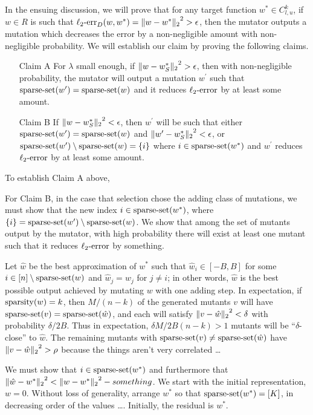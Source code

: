 In the ensuing discussion, we will prove that for any target function
$w^* \in C^k_{l,u}$, if $w \in R$ is such that
$\mathrm{\ell_2\mbox{-}err}_D(w, w^*) = {\Vert w - w^* \Vert_{2}}^2 > \epsilon$,
then the mutator outputs a mutation which decreases the error by a
non-negligible amount with non-negligible probability.
We will establish our claim by proving the following claims.

\begin{enumerate}
\item[Claim A] For $\lambda$ small enough, if ${\Vert w - w^*_S \Vert_{2}}^2 > \epsilon$,
then with non-negligible probability, the mutator will output a mutation $w^\prime$ such
that $\mathrm{sparse\mbox{-}set}(w^\prime) = \mathrm{sparse\mbox{-}set}(w)$ and it reduces $\mathrm{\ell_2\mbox{-}error}$ by at least some amount.
\item[Claim B] If ${\Vert w - w^*_S \Vert_{2}}^2 < \epsilon$, then $w^\prime$ will be
such that either $\mathrm{sparse\mbox{-}set}(w^\prime) = \mathrm{sparse\mbox{-}set}(w)$ and
${\Vert w^\prime - w^*_S \Vert_{2}}^2 < \epsilon$, or
$\mathrm{sparse\mbox{-}set}(w^\prime) \setminus \mathrm{sparse\mbox{-}set}(w) = \{i\}$ where $i \in \mathrm{sparse\mbox{-}set}(w^*)$
and $w^\prime$ reduces $\mathrm{\ell_2\mbox{-}error}$ by at least some amount.
\end{enumerate}

To establish Claim A above,

For Claim B, in the case that selection chose the adding class of mutations,
we must show that the new index $i \in \mathrm{sparse\mbox{-}set}(w^*)$, where
$\{i\} = \mathrm{sparse\mbox{-}set}(w^\prime) \setminus \mathrm{sparse\mbox{-}set}(w)$.
We show that among the set of mutants output by the mutator, with high probability
there will exist at least one mutant such that it reduces $\mathrm{\ell_2\mbox{-}error}$ by something.

Let $\hat{w}$ be the best approximation of $w^*$ such that $\hat{w}_i \in [-B, B]$
for some $i \in [n] \setminus \mathrm{sparse\mbox{-}set}(w)$ and $\hat{w}_j = w_j$ for $j \neq i$;
in other words, $\hat{w}$ is the best possible output achieved by mutating $w$ with
one adding step.
In expectation, if $\mathrm{sparsity}(w) = k$, then $M / (n - k)$ of the generated mutants
$v$ will have $\mathrm{sparse\mbox{-}set}(v) = \mathrm{sparse\mbox{-}set}(\hat{w})$, and each will satisfy
${\Vert v - \hat{w} \Vert_{2}}^2 < \delta$ with probability $\delta/2B$.
Thus in expectation, $\delta M / 2B(n - k) > 1$ mutants will be
``$\delta$-close'' to $\hat{w}$.
The remaining mutants with $\mathrm{sparse\mbox{-}set}(v) \neq \mathrm{sparse\mbox{-}set}(\hat{w})$ have
${\Vert v - \hat{w} \Vert_{2}}^2 > \rho$ because the things aren't very correlated \dots

We must show that $i \in \mathrm{sparse\mbox{-}set}(w^*)$ and furthermore that
${\Vert \hat{w} - w^* \Vert_{2}}^2 < {\Vert w - w^* \Vert_{2}}^2 - something$.
We start with the initial representation, $w=0$.
Without loss of generality, arrange $w^*$ so that $\mathrm{sparse\mbox{-}set}(w^*) = [K]$,
in decreasing order of the values \dots. Initially, the residual is $w^*$.
